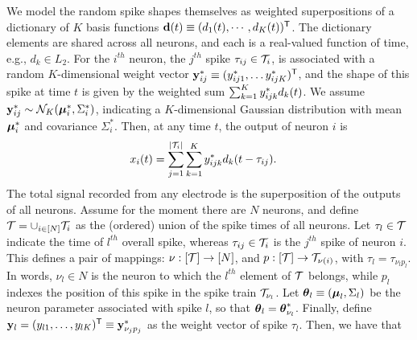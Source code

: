 We model the random spike shapes themselves as weighted superpositions of a dictionary of $K$ basis functions $\mathbf{d}(t) \equiv (d_1(t), \cdots, d_K(t))^{\mathsf{T}}$. The
dictionary elements are shared across all neurons, and each is a real-valued function of time, e.g., $d_k \in L_2$.
For the $i^{th}$ neuron, the $j^{th}$ spike $\tau_{ij} \in \mathcal{T}_i$, is associated with a random $K$-dimensional weight vector $\mathbf{y}^*_{ij} \equiv (y^*_{ij1}, \ldots y^*_{ijK})^{\mathsf{T}}$, and the 
shape of this spike at time $t$ is given by the weighted sum $\sum_{k=1}^K y^*_{ijk} d_k(t)$. We assume $\mathbf{y}^*_{ij} \sim \mathcal{N}_K(\boldsymbol{\mu}^*_i, \Sigma^*_i)$, indicating a $K$-dimensional Gaussian distribution with mean $\boldsymbol{\mu}^*_i$ and covariance $\Sigma^*_i$.   Then, at any time $t$, the output of neuron $i$ is
\begin{align}
  x_{i}(t) &= \sum_{j=1}^{|\mathcal{T}_i|} \sum_{k=1}^K y^*_{ijk} d_k(t - \tau_{ij}).
\end{align}
% 
% 
% 
% 
{The total signal recorded from any electrode  is the superposition of the outputs of all neurons. Assume for the moment there are $N$
neurons, and define $\mathcal{T} = \cup_{i \in [N]} \mathcal{T}_i$ as
the (ordered) union of the spike times of all neurons. 
Let $\tau_l \in \mathcal{T}$ indicate the time of $l^{th}$ overall spike, whereas $\tau_{ij} \in \mathcal{T}_i$ is the $j^{th}$ spike of neuron $i$.
This defines a pair of mappings: $\nu:[\mathcal{T}]\rightarrow [N]$, and $p:[\mathcal{T}]\rightarrow \mathcal{T}_{\nu(i)}$, with %
$\tau_l = \tau_{\nu_l p_l}$.  In words, $\nu_l \in N$ is the neuron to which the $l^{th}$ element of $\mathcal{T}$ belongs, 
while $p_l$ indexes the position of this spike in the spike train $\mathcal{T}_{\nu_l}$.
Let $\boldsymbol{\theta}_l \equiv (\boldsymbol{\mu}_l, \Sigma_l)$ be the neuron parameter associated with spike $l$, so that $\boldsymbol{\theta}_l = \boldsymbol{\theta}^*_{\nu_l}$. 
Finally, define $\mathbf{y}_l=(y_{l1}, \ldots, y_{lK})^{\mathsf{T}} \equiv \mathbf{y}^*_{\nu_j p_j}$ as the weight vector of spike $\tau_l$. Then, we have that}

